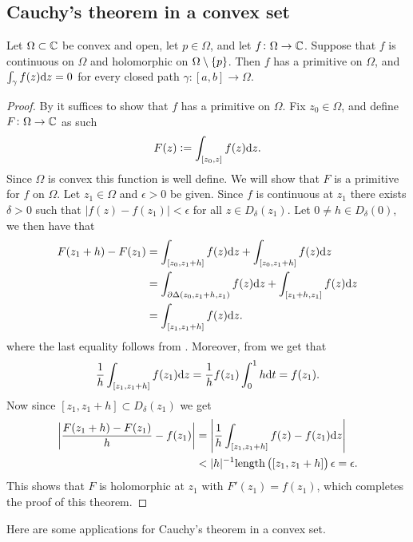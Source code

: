 \documentclass[11pt,a4paper]{article}
\begin{document}
\subsection{Cauchy's theorem in a convex set}
\begin{theorem}
  \label{thm:cauchy-convex}
  Let $\Omega \subset \mathbb{C}$ be convex and open,
  let $p \in \Omega$,
  and let $f \colon \Omega \to \mathbb{C}$.
  Suppose that $f$ is continuous on $\Omega$ and holomorphic on
  $\Omega \setminus \left\{p\right\}$.
  Then $f$ has a primitive on $\Omega$, and $\int_{\gamma} f(z) \mathrm{d} z = 0$
  for every closed path $\gamma \colon [a,b] \to \Omega$.
\end{theorem}
\begin{proof}
  By  it suffices to show that $f$ has a primitive
  on $\Omega$.
  Fix $z_0 \in \Omega$, and define $F \colon \Omega \to \mathbb{C}$ as such
  \[
    F(z) := \int_{[z_0,z]} f(z) \mathrm{d} z.
  \]
  Since $\Omega$ is convex this function is well define.
  We will show that $F$ is a primitive for $f$ on $\Omega$.
  Let $z_1 \in \Omega$ and $\epsilon > 0$ be given.
  Since $f$ is continuous at $z_1$ there exists $\delta > 0$ such
  that $|f(z) - f(z_1)| < \epsilon$ for all $z \in D_{\delta}(z_1)$.
  Let $0 \neq h \in D_{\delta}(0)$,
  we then have that
  \begin{align*}
    F(z_1 + h) - F(z_1) &=
    \int_{[z_0,z_1 + h]} f(z) \mathrm{d} z + \int_{[z_0,z_1 + h]} f(z) \mathrm{d} z \\ &=
    \int_{\partial \Delta(z_0,z_1+h,z_1)} f(z) \mathrm{d} z +
    \int_{[z_1 + h,z_1]} f(z) \mathrm{d} z \\ &=
    \int_{[z_1,z_1+h]} f(z) \mathrm{d} z.
  \end{align*}
  where the last equality follows from .
  Moreover, from  we get that
  \[
    \frac{1}{h} \int_{[z_1,z_1+h]} f(z_1) \mathrm{d} z =
    \frac{1}{h} f(z_1) \int_{0}^{1} h \mathrm{d} t = f(z_1).
  \]
  Now since $[z_1,z_1+h] \subset D_{\delta}(z_1)$ we get
  \begin{align*}
    \abs{\frac{F(z_1 + h) - F(z_1)}{h} - f(z_1)} &=
    \abs{\frac{1}{h} \int_{[z_1,z_1+h]} f(z) - f(z_1) \dz} \\ &<
    |h|^{-1} \length\del{[z_1,z_1+h]} \epsilon = \epsilon.
  \end{align*}
  This shows that $F$ is holomorphic at $z_1$ with $F'(z_1) = f(z_1)$,
  which completes the proof of this theorem.
\end{proof}
\begin{remark}
Here are some applications for Cauchy's theorem in a convex set.
\end{remark}
\end{document}
